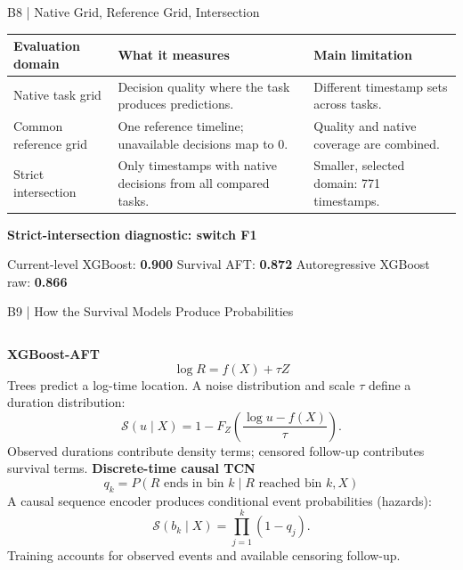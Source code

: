\begin{frame}[noframenumbering]{B8 | Native Grid, Reference Grid, Intersection}
\small
\renewcommand{\arraystretch}{1.5}
\begin{tabularx}{\textwidth}{@{}>{\raggedright\arraybackslash}p{29mm}>{\raggedright\arraybackslash}X>{\raggedright\arraybackslash}X@{}}
\toprule
Evaluation domain & What it measures & Main limitation\\\midrule
Native task grid & Decision quality where the task produces predictions. & Different timestamp sets across tasks.\\
Common reference grid & One reference timeline; unavailable decisions map to 0. & Quality and native coverage are combined.\\
Strict intersection & Only timestamps with native decisions from all compared tasks. & Smaller, selected domain: 771 timestamps.\\
\bottomrule
\end{tabularx}\par
\vspace{4mm}
\textbf{Strict-intersection diagnostic: switch F1}\par\vspace{2mm}
Current-level XGBoost: \textbf{0.900}\quad
Survival AFT: \textbf{0.872}\quad
Autoregressive XGBoost raw: \textbf{0.866}
\end{frame}

\begin{frame}[noframenumbering]{B9 | How the Survival Models Produce Probabilities}
\begin{columns}[T,onlytextwidth]
\textcolor{survival}{\textbf{XGBoost-AFT}}
\[
\log R=f(X)+\tau Z
\]
\small Trees predict a log-time location. A noise distribution and scale $\tau$ define a duration distribution:
\[
\mathcal S(u\mid X)=1-F_Z\!\left(\frac{\log u-f(X)}{\tau}\right).
\]
\small Observed durations contribute density terms; censored follow-up contributes survival terms.
\textcolor{survival}{\textbf{Discrete-time causal TCN}}
\[
q_k=P(R\text{ ends in bin }k\mid R\text{ reached bin }k,X)
\]
\small A causal sequence encoder produces conditional event probabilities (hazards):
\[
\mathcal S(b_k\mid X)=\prod_{j=1}^{k}(1-q_j).
\]
\small Training accounts for observed events and available censoring follow-up.
\end{columns}
\end{frame}

